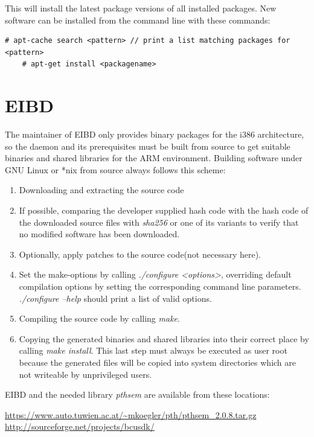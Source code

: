 This will install the latest package versions of all installed packages. New software can be installed from the command line with these commands:

\begin{lstlisting}[style=BashInputStyle]
    # apt-cache search <pattern> // print a list matching packages for <pattern> 
    # apt-get install <packagename>
\end{lstlisting}

\section{EIBD}

The maintainer of EIBD only provides binary packages for the i386 architecture, so the daemon and its prerequisites must be built from source to get
suitable binaries and shared libraries for the ARM environment. Building software under GNU Linux or *nix from source always follows this scheme:

\begin{enumerate}
 \item Downloading and extracting the source code
 \item If possible, comparing the developer supplied hash code  with the hash code of the downloaded source files with
 \textit{sha256} or one of its variants to verify that no modified software has been downloaded.
 \item Optionally, apply patches to the source code(not necessary here).
 \item Set the make-options by calling \textit{./configure <options>}, overriding default compilation options by setting the corresponding command line parameters.
 \textit{./configure --help} should print a list of valid options.
 \item Compiling the source code by calling \textit{make}.
 \item Copying the generated binaries and shared libraries into their correct place by calling \textit{make install}. This last step must always be executed
 as user root because the generated files will be copied into system directories which are not writeable by unprivileged users.
\end{enumerate}

EIBD and the needed library \textit{pthsem} are available from these locations:

\url{https://www.auto.tuwien.ac.at/~mkoegler/pth/pthsem_2.0.8.tar.gz}
\url{http://sourceforge.net/projects/bcusdk/}

